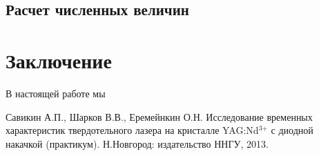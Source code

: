 \documentclass[a4paper,14pt]{extarticle}
\begin{document}
\subsection{Расчет численных величин}


\section*{Заключение}
В настоящей работе мы 

\begin{thebibliography}{}

   Савикин А.П., Шарков В.В., Еремейнкин О.Н. Исследование временных характеристик твердотельного лазера на кристалле  YAG:Nd${}^{{3\texttt{+}}}$ с диодной накачкой (практикум). Н.Новгород: издательство ННГУ, 2013.

\end{thebibliography}
\end{document}
